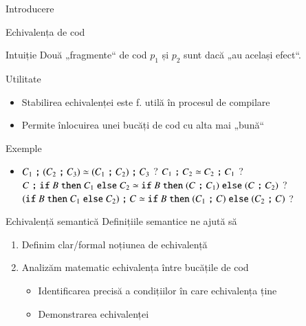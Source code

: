 
\begin{section}{Introducere}
\begin{frame}{Echivalența de cod}
\begin{block}{Intuiție}
Două „fragmente“ de cod $p_1$ și $p_2$ sunt  dacă „au același efect“.
\end{block}

\vfill \begin{block}{Utilitate}
\begin{itemize}
\item Stabilirea echivalenței este f. utilă în procesul de compilare
\item Permite înlocuirea unei bucăți de cod cu alta mai „bună“ 
\end{itemize}
\end{block}

\end{frame}


\begin{frame}{Exemple}
\begin{itemize}
\item $C_1 \mathrel{\text{\ttfamily ;}} (C_2 \mathrel{\text{\ttfamily ;}} C_3) \simeq (C_1 \mathrel{\text{\ttfamily ;}} C_2) \mathrel{\text{\ttfamily ;}} C_3$ ?
\vitem $C_1 \mathrel{\text{\ttfamily ;}} C_2 \simeq C_2 \mathrel{\text{\ttfamily ;}} C_1$ ?
\vitem $C \mathrel{\text{\ttfamily ;}} {\mathrel{\text{\ttfamily if}} B \mathrel{\text{\ttfamily then}} C_1 \mathrel{\text{\ttfamily else}} C_2}  \simeq {\ensuremath\mathrel{\text{\ttfamily if}}B \ensuremath\mathrel{\text{\ttfamily then}}(C \ensuremath\mathrel{\text{\ttfamily ;}} C_1) \ensuremath\mathrel{\text{\ttfamily else}}(C \ensuremath\mathrel{\text{\ttfamily ;}} C_2)}$ ?
\vitem $({\mathrel{\text{\ttfamily if}} B \mathrel{\text{\ttfamily then}} C_1 \mathrel{\text{\ttfamily else}} C_2}) \mathrel{\text{\ttfamily ;}} C  \simeq {\ensuremath\mathrel{\text{\ttfamily if}}B \ensuremath\mathrel{\text{\ttfamily then}}(C_1 \ensuremath\mathrel{\text{\ttfamily ;}} C) \ensuremath\mathrel{\text{\ttfamily else}}(C_2 \ensuremath\mathrel{\text{\ttfamily ;}} C)}$ ?
\end{itemize}

\end{frame}


\begin{frame}{Echivalență semantică}
Definițiile semantice ne ajută să 
\begin{enumerate}
\item Definim clar/formal noțiunea de echivalență
\item Analizăm matematic echivalența între bucățile de cod
\begin{itemize}
\item Identificarea precisă a condițiilor în care echivalența ține
\item Demonstrarea echivalenței
\end{itemize}
\end{enumerate}
\end{frame}

\end{section}


